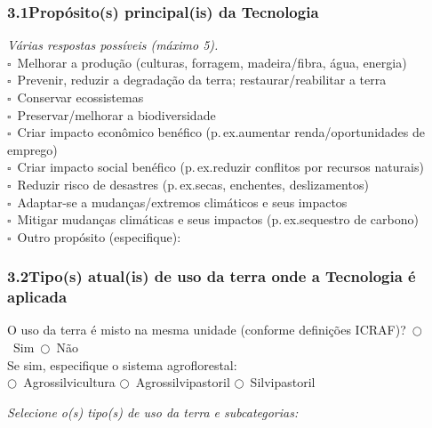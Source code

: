 \subsubsection*{3.1\quad Propósito(s) principal(is) da Tecnologia}
\textit{Várias respostas possíveis (máximo 5).}\\[4pt]
$\square$~Melhorar a produção (culturas, forragem, madeira/fibra, água, energia)\\
$\square$~Prevenir, reduzir a degradação da terra; restaurar/reabilitar a terra\\
$\square$~Conservar ecossistemas\\
$\square$~Preservar/melhorar a biodiversidade\\
$\square$~Criar impacto econômico benéfico (p.\,ex.\@ aumentar renda/oportunidades de emprego)\\
$\square$~Criar impacto social benéfico (p.\,ex.\@ reduzir conflitos por recursos naturais)\\
$\square$~Reduzir risco de desastres (p.\,ex.\@ secas, enchentes, deslizamentos)\\
$\square$~Adaptar-se a mudanças/extremos climáticos e seus impactos\\
$\square$~Mitigar mudanças climáticas e seus impactos (p.\,ex.\@ sequestro de carbono)\\
$\square$~Outro propósito (especifique): \dotfill

\subsubsection*{3.2\quad Tipo(s) atual(is) de uso da terra onde a Tecnologia é aplicada}

O uso da terra é misto na mesma unidade (conforme definições ICRAF)?~$\bigcirc$~Sim~$\bigcirc$~Não\\
Se sim, especifique o sistema agroflorestal:\\
$\bigcirc$~Agrossilvicultura \quad $\bigcirc$~Agrossilvipastoril \quad $\bigcirc$~Silvipastoril

\medskip\noindent
\textit{Selecione o(s) tipo(s) de uso da terra e subcategorias:}

